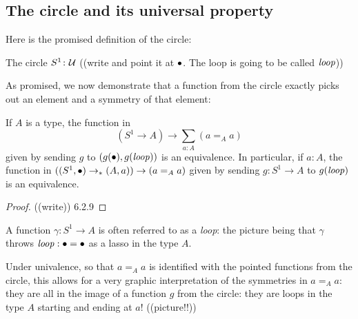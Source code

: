 \subsection{The circle and its universal property}
\label{sec:S1}

Here is the promised definition of the circle:
\begin{definition}
  \label{def:circle}
The circle $S^1\colon\mathcal{U}$ ((write and point it at $\bullet$.  The loop is going to be called $\mathit{loop}$))
\end{definition}
As promised, we now demonstrate that a function from the circle exactly picks out an element and a symmetry of that element:
\begin{lemma}\label{lem:freeloopspace}
  If $A$ is a type, the function in $$(S^1\to A)\to \sum_{a:A}(a=_Aa)$$
given by sending $g$ to $(g(\bullet),g(\mathit{loop}))$ is an equivalence.  In particular, if $a:A$, the function in $((S^1,\bullet)\to_* (A,a))\to (a=_Aa)$ given by sending $g:S^1\to A$ to $g(\mathit{loop})$ is an equivalence. 
\end{lemma}
\begin{proof}
  ((write)) 6.2.9
\end{proof}
\begin{remark}
  A function $\gamma:S^1\to A$ is often referred to as a \emph{loop}: the picture being that $\gamma$ throws $\mathit{loop}:\bullet=\bullet$ as a lasso in the type $A$.

  Under univalence, so that $a=_Aa$ is identified with the pointed functions from the circle, this allows for a very graphic interpretation of the symmetries in $a=_Aa$: they are all in the image of a function $g$ from the circle: they are loops in the type $A$ starting and ending at $a$! ((picture!!))
\end{remark}



